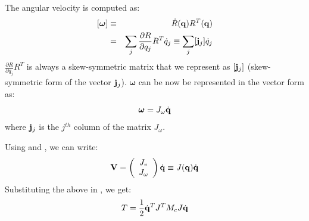The angular velocity is computed as:
\begin{eqnarray}
\nonumber
[\bm{\omega}] & \equiv & \dot{R}(\mathbf{q})R^T(\mathbf{q}) \\
\label{eq:Jaccolj}
& = & \sum_j \frac{\partial R}{\partial q_j}R^T \dot{q}_j \equiv \sum_j [\mathbf{j}_{j}] \dot{q}_j
\end{eqnarray}
$\frac{\partial R}{\partial q_j}R^T$ is always a skew-symmetric matrix that we represent as $[\mathbf{j}_{j}]$ (skew-symmetric form of the vector $\mathbf{j}_j$). $\bm{\omega}$ can be now be represented in the vector form as:
\begin{equation}
\label{eq:velang}
\bm{\omega} = J_{\omega} \dot{\mathbf{q}}
\end{equation}
where $\mathbf{j}_{j}$ is the $j^{th}$ column of the matrix $J_{\omega}$.

Using  and , we can write:
\begin{equation}
\label{eq:velcartall}
\mathbf{V} = \left(
\begin{array}{c}
J_v \\
J_{\omega}
\end{array}
\right) \dot{\mathbf{q}} \equiv J(\mathbf{q})\dot{\mathbf{q}}
\end{equation}
Substituting the above in , we get:
\begin{equation}
T = \frac{1}{2}\dot{\mathbf{q}}^T J^T M_c J \dot{\mathbf{q}}
\end{equation}


